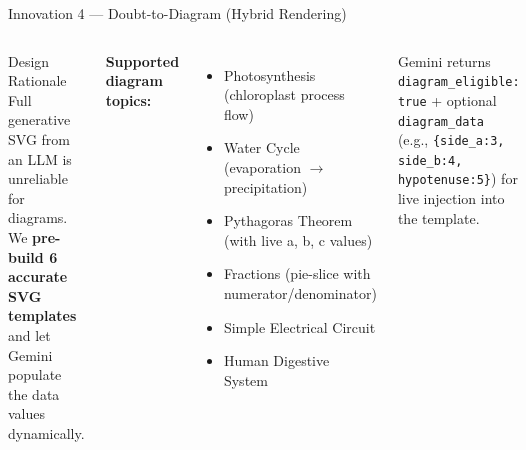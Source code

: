 \documentclass[aspectratio=169, 12pt]{beamer}
\begin{document}
\begin{frame}{Innovation 4 — Doubt-to-Diagram (Hybrid Rendering)}
  \begin{columns}[T]
      \begin{block}{Design Rationale}
        Full generative SVG from an LLM is unreliable for diagrams.
        We \textbf{pre-build 6 accurate SVG templates} and let
        Gemini populate the data values dynamically.
      \end{block}
      \vspace{4pt}
      \textbf{Supported diagram topics:}
      \begin{itemize}\small
        \item Photosynthesis (chloroplast process flow)
        \item Water Cycle (evaporation $\to$ precipitation)
        \item Pythagoras Theorem (with live a, b, c values)
        \item Fractions (pie-slice with numerator/denominator)
        \item Simple Electrical Circuit
        \item Human Digestive System
      \end{itemize}
      \vspace{4pt}
      \small Gemini returns \texttt{diagram\_eligible: true} +
      optional \texttt{diagram\_data} \\ (e.g., \texttt{\{side\_a:3, side\_b:4, hypotenuse:5\}})
      for live injection into the template.
  \end{columns}
\end{frame}
\end{document}
